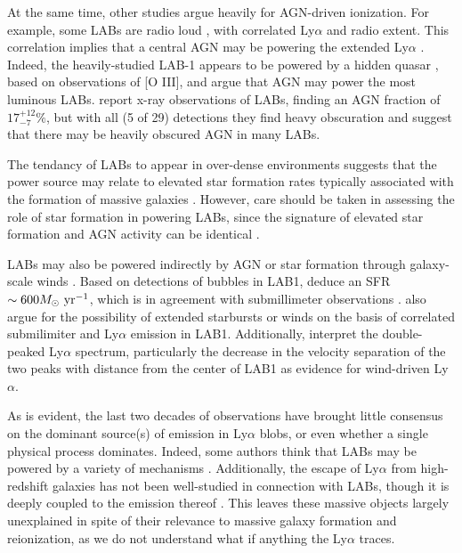 At the same time, other studies argue heavily for AGN-driven ionization.
For example, some LABs are radio loud \citep{Miley2008}, with correlated Ly$\alpha$ and radio extent.
This correlation implies that a central AGN may be powering the extended Ly$\alpha$ \citep{vanOjik1997}.
Indeed, the heavily-studied LAB-1 appears to be powered by a hidden quasar \citep{Overzier2013}, based on observations of \textsc{[O III]}, and argue that AGN may power the most luminous LABs.
\citet{Geach2009} report x-ray observations of LABs, finding an AGN fraction of $17^{+12}_{-7}\%$, but with all (5 of 29) detections they find heavy obscuration and suggest that there may be heavily obscured AGN in many LABs.

The tendancy of LABs to appear in over-dense environments \citep{Matsuda2009,Matsuda2011,Prescott2008} suggests that the power source may relate to elevated star formation rates typically associated with the formation of massive galaxies \citep[e.g.][]{Matsuda2007,Kubo2013,Hine2016,Alexander2016}.
However, care should be taken in assessing the role of star formation in powering LABs, since the signature of elevated star formation and AGN activity can be identical \citep{Webb2009}.

LABs may also be powered indirectly by AGN or star formation through galaxy-scale winds \citep{Wilman2005}.
Based on detections of bubbles in LAB1, \citet{Matsuda2004} deduce an SFR $\sim 600M_{\odot}\ \rm{yr}^{-1}$, which is in agreement with submillimeter observations \citep{Chapman2001}.
\citep{Matsuda2007} also argue for the possibility of extended starbursts or winds on the basis of correlated submilimiter and Ly$\alpha$ emission in LAB1.
Additionally, \citet{Ohyama2003} interpret the double-peaked Ly$\alpha$ spectrum, particularly the decrease in the velocity separation of the two peaks with distance from the center of LAB1 as evidence for wind-driven Ly$\alpha$.

As is evident, the last two decades of observations have brought little consensus on the dominant source(s) of emission in Ly$\alpha$ blobs, or even whether a single physical process dominates.
Indeed, some authors think that LABs may be powered by a variety of mechanisms \citet{Scarlata2009,Webb2009,Nilsson2006,Prescott2009,Ao2015}.
Additionally, the escape of Ly$\alpha$ from high-redshift galaxies has not been well-studied in connection with LABs, though it is deeply coupled to the emission thereof \citep{Smith2019}.
This leaves these massive objects largely unexplained in spite of their relevance to massive galaxy formation and reionization, as we do not understand what if anything the Ly$\alpha$ traces.

